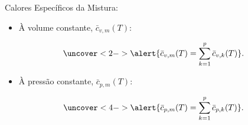     \begin{frame}{Calores Específicos da Mistura:}\vspace*{-2em}
        \begin{itemize}
            \item<1-> À volume constante, \alert{$\bar{c}_{v,m}(T)$}:
        \end{itemize}
        \vspace*{0.8em}\begin{equation*}
            \uncover<2->{
                \alert{\bar{c}_{v,m}(T) =
                    \sum_{k=1}^p \bar{c}_{v,k}(T)}.
            }
        \end{equation*}
        \vspace*{-0.8em}\begin{itemize}
            \item<3-> À pressão constante, \alert{$\bar{c}_{p,m}(T)$}:
        \end{itemize}
        \vspace*{0.8em}\begin{equation*}
            \uncover<4->{
                \alert{\bar{c}_{p,m}(T) =
                    \sum_{k=1}^p \bar{c}_{p,k}(T)}.
            }
        \end{equation*}
    \end{frame}

